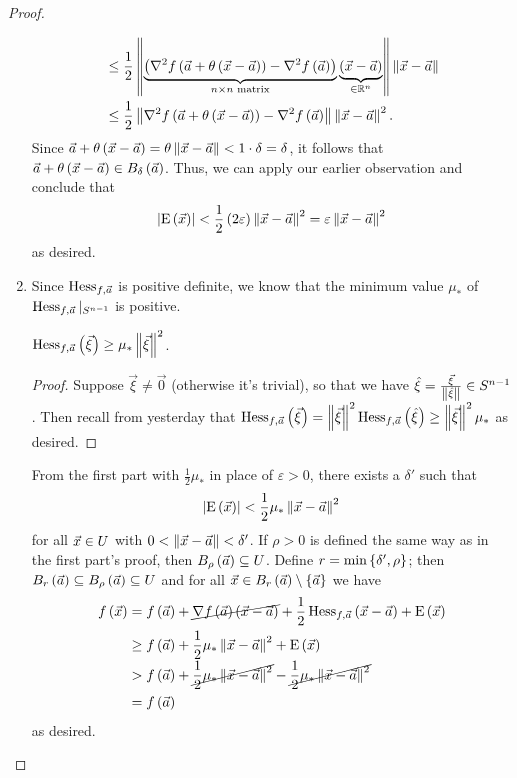 \documentclass[main.tex]{subfiles}
\begin{document}
\begin{proof}
\begin{enumerate}
\begin{align*}
            &\le \frac{1}{2}\left\lVert \underbrace{\left( \nabla^2 f\left( \vec{a} + \theta\left( \vec{x} - \vec{a} \right) \right) - \nabla^2 f\left( \vec{a} \right) \right)}_{n\times n\text{ matrix}} \underbrace{\left( \vec{x} - \vec{a} \right)}_{\in \mathbb R^n} \right\rVert\left\lVert \vec{x} - \vec{a} \right\rVert \\
            &\le \frac{1}{2}\left\lVert \nabla^2 f\left( \vec{a} + \theta\left( \vec{x} - \vec{a} \right) \right) - \nabla^2 f\left( \vec{a} \right) \right\rVert\left\lVert \vec{x} - \vec{a} \right\rVert^2.
        \end{align*}
        Since $\vec{a} + \theta\left( \vec{x} - \vec{a} \right) = \theta\left\lVert \vec{x} - \vec{a} \right\rVert < 1\cdot \delta = \delta$, it follows that $\vec{a} + \theta\left( \vec{x} - \vec{a} \right) \in B_\delta\left( \vec{a} \right)$. Thus, we can apply our earlier observation and conclude that
        \[\left\lvert \mathrm{E}\left( \vec{x} \right) \right\rvert < \frac{1}{2}\left( 2\varepsilon \right)\left\lVert \vec{x} - \vec{a} \right\rVert^2 = \varepsilon\left\lVert \vec{x} - \vec{a} \right\rVert^2\]
        as desired.
         
        \item Since $\operatorname{Hess}_{f, \vec{a}}$ is positive definite, we know that the minimum value $\mu_*$ of $\operatorname{Hess}_{f, \vec{a}} |_{S^{n - 1}}$ is positive.

        \begin{claim}
             $\operatorname{Hess}_{f, \vec{a}}\left( \vec\xi \right) \ge \mu_*\left\lVert \vec\xi \right\rVert^2$.
        \end{claim}

        \begin{proof}
             Suppose $\vec\xi\neq \vec{0}$ (otherwise it's trivial), so that we have $\hat{\xi} = \frac{\vec\xi}{\left\lVert \hat\xi \right\rVert}\in S^{n - 1}$. Then recall from yesterday that $\operatorname{Hess}_{f, \vec{a}}\left( \vec\xi \right) = \left\lVert \vec\xi \right\rVert^2 \operatorname{Hess}_{f, \vec{a}}\left( \hat{\xi} \right) \ge \left\lVert \vec\xi \right\rVert^2 \mu_*$ as desired.
        \end{proof}
        From the first part with $\frac{1}{2}\mu_*$ in place of $\varepsilon > 0$, there exists a $\delta'$ such that
        \[\left\lvert \mathrm{E}\left( \vec{x} \right) \right\rvert < \frac{1}{2}\mu_*\left\lVert \vec{x} - \vec{a} \right\rVert^2\]
        for all $\vec{x}\in U$ with $0 < \left\lVert \vec{x} - \vec{a} \right\rVert < \delta'$. If $\rho > 0$ is defined the same way as in the first part's proof, then $B_\rho\left( \vec{a} \right) \subseteq U$. Define $r = \min\left\{ \delta', \rho \right\}$; then $B_r\left( \vec{a} \right)\subseteq B_\rho\left( \vec{a} \right)\subseteq U$ and for all $\vec{x}\in B_r\left( \vec{a} \right)\setminus\left\{ \vec{a} \right\}$ we have
        \begin{align*}
            f\left( \vec{x} \right) &= f\left( \vec{a} \right) + \cancel{\nabla f\left( \vec{a} \right)\left( \vec{x} - \vec{a} \right)} + \frac{1}{2}\operatorname{Hess}_{f, \vec{a}}\left( \vec{x} - \vec{a} \right) + \mathrm{E}\left( \vec{x} \right) \\
            &\ge f\left( \vec{a} \right) + \frac{1}{2}\mu_*\left\lVert \vec{x} - \vec{a} \right\rVert^2 + \mathrm{E}\left( \vec{x} \right) \\
            &> f\left( \vec{a} \right) + \cancel{\frac{1}{2}\mu_*\left\lVert \vec{x} - \vec{a} \right\rVert^2} - \cancel{\frac{1}{2}\mu_*\left\lVert \vec{x} - \vec{a} \right\rVert^2} \\
            &= f\left( \vec{a} \right)
        \end{align*}
        as desired.
    \end{enumerate}
\end{proof}
\end{document}
